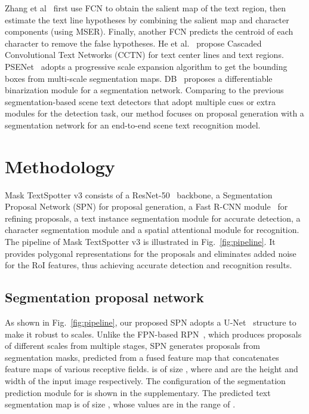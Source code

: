 \documentclass[runningheads]{llncs}
\newcommand{\minisection}[1]{\noindent{\textbf{#1}}}
\begin{document}
\minisection{Segmentation-based scene text detectors}
Zhang et al~\cite{zhang2016multi} first use FCN to obtain the salient map of the text region, then estimate the text line hypotheses by combining the salient map and character components (using MSER). Finally, another FCN predicts the centroid of each character to remove the false hypotheses. 
He et al.~\cite{he2016accurate} propose Cascaded Convolutional Text Networks (CCTN) for text center lines and text regions. PSENet~\cite{wang2019shape} adopts a progressive scale expansion algorithm to get the bounding boxes from multi-scale segmentation maps. DB~\cite{LiaoWYCB20} proposes a differentiable binarization module for a segmentation network. Comparing to the previous segmentation-based scene text detectors that adopt multiple cues or extra modules for the detection task, our method focuses on proposal generation with a segmentation network for an end-to-end scene text recognition model.


\section{Methodology}
Mask TextSpotter v3 consists of a ResNet-50~\cite{he2016deep} backbone, a Segmentation Proposal Network (SPN) for proposal generation, a Fast R-CNN module~\cite{fastrcnn} for refining proposals, a text instance segmentation module for accurate detection, a character segmentation module and a spatial attentional module for recognition. The pipeline of Mask TextSpotter v3 is illustrated in Fig.~\ref{fig:pipeline}. It provides polygonal representations for the proposals and eliminates added noise for the RoI features, thus achieving accurate detection and recognition results.

\subsection{Segmentation proposal network}
As shown in Fig.~\ref{fig:pipeline}, our proposed SPN adopts a U-Net~\cite{ronneberger2015u} structure to make it robust to scales. Unlike the FPN-based RPN~\cite{lin2017feature,ren2015faster}, which produces proposals of different scales from multiple stages, SPN generates proposals from segmentation masks, predicted from a fused feature map  that concatenates feature maps of various receptive fields.  is of size , where  and  are the height and width of the input image respectively. The configuration of the segmentation prediction module for  is shown in the supplementary. The predicted text segmentation map  is of size , whose values are in the range of .
\end{document}
